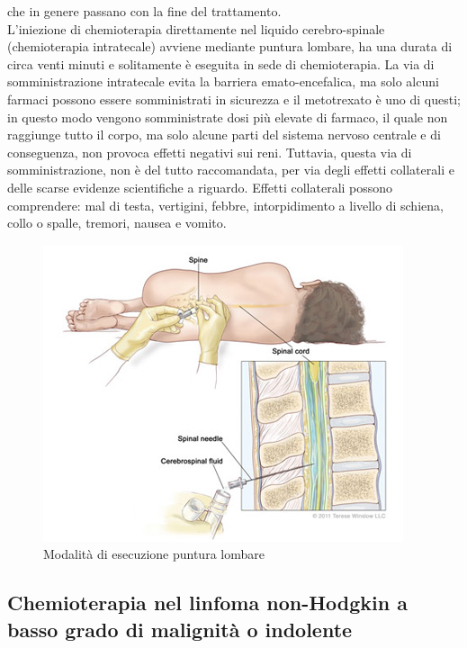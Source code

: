 che in genere passano con la fine del trattamento\cite{CNS}.\\
L’iniezione di chemioterapia direttamente nel liquido cerebro-spinale (chemioterapia intratecale) avviene mediante 
puntura lombare, ha una durata di circa venti minuti e solitamente è eseguita in sede di chemioterapia. 
La via di somministrazione intratecale evita la barriera emato-encefalica, ma solo alcuni farmaci possono essere 
somministrati in sicurezza e il metotrexato è uno di questi; in questo modo vengono somministrate dosi più elevate di 
farmaco, il quale non raggiunge tutto il corpo, ma solo alcune parti del sistema nervoso centrale e di 
conseguenza, non provoca effetti negativi sui reni. Tuttavia, questa via di somministrazione, non è del tutto 
raccomandata, per via degli effetti collaterali e delle scarse evidenze scientifiche a riguardo. 
Effetti collaterali possono comprendere: mal di testa, vertigini, febbre, intorpidimento a livello di schiena, 
collo o spalle, tremori, nausea e vomito\cite{CNS}.\\

\begin{figure}[H]
    \begin{center}
    \includegraphics[width=0.7\columnwidth]{img/Lumbar-Puncture.jpeg}
    \end{center}
    \caption[Modalità di esecuzione puntura lombare]{Modalità di esecuzione puntura lombare
    \cite{img39}}

\end{figure}

\subsection{Chemioterapia nel linfoma non-Hodgkin a basso grado di malignità o indolente}

